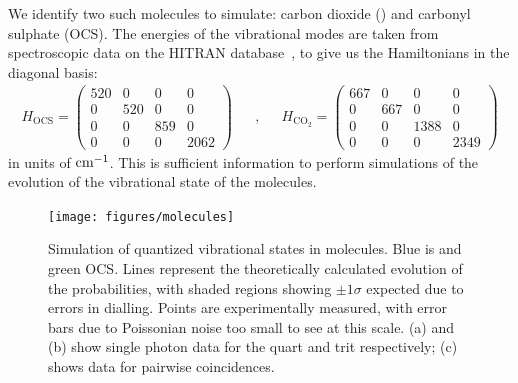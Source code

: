 We identify two such molecules to simulate: carbon dioxide (\co{}) and carbonyl
sulphate (OCS). The energies of the vibrational modes are taken from
spectroscopic data on the HITRAN database~\cite{hitran}, to give us the
Hamiltonians in the diagonal basis:
\begin{align}
  H_{\text{OCS}} = \begin{pmatrix}
    520 & 0 & 0 & 0 \\
    0 & 520 & 0 & 0 \\
    0 & 0 & 859 & 0 \\
    0 & 0 & 0 & 2062 \end{pmatrix} && , && H_{\text{CO}_{2}} = \begin{pmatrix}
    667 & 0 & 0 & 0 \\
    0 & 667 & 0 & 0 \\
    0 & 0 & 1388 & 0 \\
    0 & 0 & 0 & 2349 \end{pmatrix}
\end{align}
in units of \(\text{cm}^{-1}\). This is sufficient information to perform simulations
of the evolution of the vibrational state of the molecules.

\begin{figure}
  \centering
  \texttt{[image: figures/molecules]}
  \caption[Simulation of quantized vibrational states in molecules]
  {Simulation of quantized vibrational states in molecules. Blue is \co{} and
  green OCS. Lines represent the theoretically calculated evolution of the
  probabilities, with shaded regions showing \(\pm 1 \sigma\) expected due to
  errors in dialling. Points are experimentally measured, with error bars due to
  Poissonian noise too small to see at this scale. (a) and (b) show single
  photon data for the quart and trit respectively; (c) shows data for
  pairwise coincidences.}
  \label{fig:molecules}
\end{figure}

